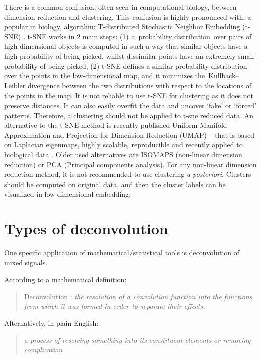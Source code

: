 \documentclass[12pt,]{book}
\theoremstyle{definition}
\theoremstyle{definition}
\theoremstyle{definition}
\theoremstyle{remark}
\begin{document}
There is a common confusion, often seen in computational biology,
between dimension reduction and clustering. This confusion is highly
pronounced with, a popular in biology, algorithm: T-distributed
Stochastic Neighbor Embedding (t-SNE) \citep{VanDerMaaten2008}. t-SNE
works in 2 main steps: (1) a~probability distribution~over pairs of
high-dimensional objects is computed in such a way that similar objects
have a high probability of being picked, whilst dissimilar points have
an extremely small probability of being picked, (2) t-SNE defines a
similar probability distribution over the points in the low-dimensional
map, and it minimizes the~Kullback--Leibler divergence between the two
distributions with respect to the locations of the points in the map. It
is not reliable to use t-SNE for clustering as it does not preserve
distances. It can also easily overfit the data and uncover `fake' or
`forced' patterns. Therefore, a clustering should not be applied to
t-sne reduced data. An alternative to the t-SNE method is recently
published Uniform Manifold Approximation and Projection for Dimension
Reduction (UMAP) \citep{Mcinnes2018}-- that is based on Laplacian
eigenmaps, highly scalable, reproducible and recently applied to
biological data \citep{Becht2018}. Older used alternatives are ISOMAPS
(non-linear dimension reduction) or PCA (Principal components analysis).
For any non-linear dimension reduction method, it is not recommended to
use clustering \emph{a posteriori}. Clusters should be computed on
original data, and then the cluster labels can be visualized in
low-dimensional embedding.

\hypertarget{types-of-deconvolution}{%
\section{Types of deconvolution}\label{types-of-deconvolution}}

One specific application of mathematical/statistical tools is
deconvolution of mixed signals.

According to a mathematical definition:

\begin{quote}
Deconvolution : \emph{the resolution of a convolution function into the
functions from which it was formed in order to separate their effects.}
\citep{deconvolution}
\end{quote}

Alternatively, in plain English:

\begin{quote}
\emph{a process of resolving something into its constituent elements or
removing complication} \citep{deconvolution}
\end{quote}
\end{document}
